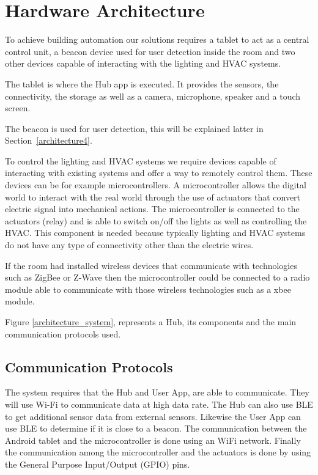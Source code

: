\section{Hardware Architecture}\label{architecture3} 

To achieve building automation our solutions requires a tablet to act as a central control unit, a beacon device used for user detection inside the room and two other devices capable of interacting with the lighting and \ac{HVAC} systems.

The tablet is where the Hub app is executed. It provides the sensors, the connectivity, the storage as well as a camera, microphone, speaker and a touch screen. 

The beacon is used for user detection, this will be explained latter in Section~\ref{architecture4}.

To control the lighting and \ac{HVAC} systems we require devices capable of interacting with existing systems and offer a way to remotely control them. These devices can be for example microcontrollers. A microcontroller allows the digital world to interact with the real world through the use of actuators that convert electric signal into mechanical actions. The microcontroller is connected to the actuators (relay) and is able to switch on/off the lights as well as controlling the HVAC. This component is needed because typically lighting and HVAC systems do not have any type of connectivity other than the electric wires. 


If the room had installed wireless devices that communicate with technologies such as ZigBee or Z-Wave then the microcontroller could be connected to a radio module able to communicate with those wireless technologies such as a xbee module.


Figure \ref{architecture_system}, represents a Hub, its components and the main communication protocols used.

 

\subsection{Communication Protocols}

The system requires that the Hub and User App, are able to communicate. They will use Wi-Fi to communicate data at high data rate. The Hub can also use \ac{BLE} to get additional sensor data from external sensors. Likewise the User App can use \ac{BLE} to determine if it is close to a beacon. The communication between the Android tablet and the microcontroller is done using an WiFi network. Finally the communication among the microcontroller and the actuators is done by using the General Purpose Input/Output (GPIO) pins.




